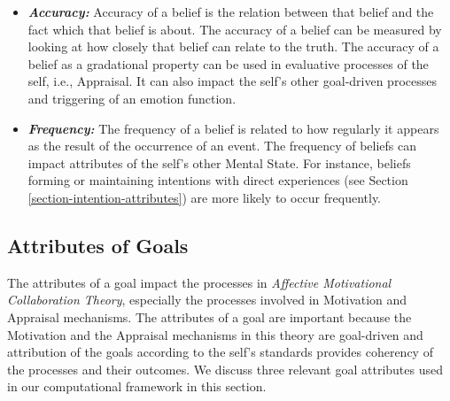 \documentclass[12pt]{report}
\begin{document}
\begin{itemize}
  \item \textbf{\textit{Accuracy:}} Accuracy of a belief is the relation between
  that belief and the fact which that belief is about. The accuracy of a belief
  can be measured by looking at how closely that belief can relate to the truth.
  The accuracy of a belief as a gradational property can be used in evaluative
  processes of the self, i.e., Appraisal. It can also impact the self's other
  goal-driven processes and triggering of an emotion function.
  
  \item \textbf{\textit{Frequency:}} The frequency of a belief is related to how
  regularly it appears as the result of the occurrence of an event. The
  frequency of beliefs can impact attributes of the self's other Mental State.
  For instance, beliefs forming or maintaining intentions with direct
  experiences (see Section \ref{section-intention-attributes}) are more likely
  to occur frequently.
\end{itemize}

\subsection{Attributes of Goals}
\label{section-goal-attributes}

The attributes of a goal impact the processes in \textit{Affective Motivational
Collaboration Theory}, especially the processes involved in Motivation and
Appraisal mechanisms. The attributes of a goal are important because the
Motivation and the Appraisal mechanisms in this theory are goal-driven and
attribution of the goals according to the self's standards provides coherency of
the processes and their outcomes. We discuss three relevant goal attributes used
in our computational framework in this section.
\end{document}
